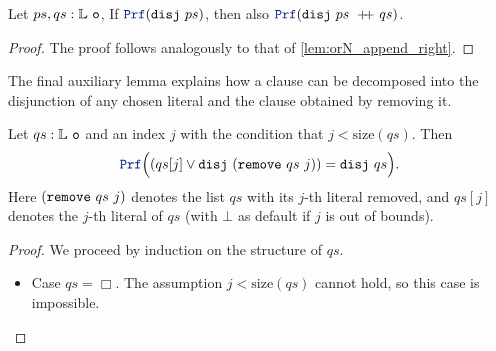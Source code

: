 \begin{lemma}\label{lem:orN_append_left}
Let $ps,qs: \mathbb{L}~\texttt{o}$, If $\prf(\kw{disj}~ps)$, then also $\prf(\kw{disj}~ps \concat qs)$.
\begin{proof}
The proof follows analogously to that of \cref{lem:orN_append_right}.
\end{proof}
\end{lemma}

The final auxiliary lemma explains how a clause can be decomposed into the disjunction
of any chosen literal and the clause obtained by removing it.

\begin{lemma}\label{lem:orN_remove}
Let $qs: \mathbb{L}~\texttt{o}$ and an index $j$ with the condition that $j < \mathrm{size}(qs)$. Then
\[
  \prf\Bigl((qs[j] \lor \kw{disj}~(\kw{remove}~qs~j)) = \kw{disj}~qs\Bigr).
\]
Here $(\texttt{\upshape{remove}}~qs~j)$ denotes the list $qs$ with its $j$-th literal removed, and
$qs[j]$ denotes the $j$-th literal of $qs$ (with $\bot$ as default if $j$ is out of bounds).
\begin{proof}
We proceed by induction on the structure of $qs$.

\begin{itemize}
  \item[] Case $qs=\Box$.  The assumption $j < \mathrm{size}(qs)$ cannot hold, so this case is impossible.


\end{itemize}
\end{proof}
\end{lemma}
